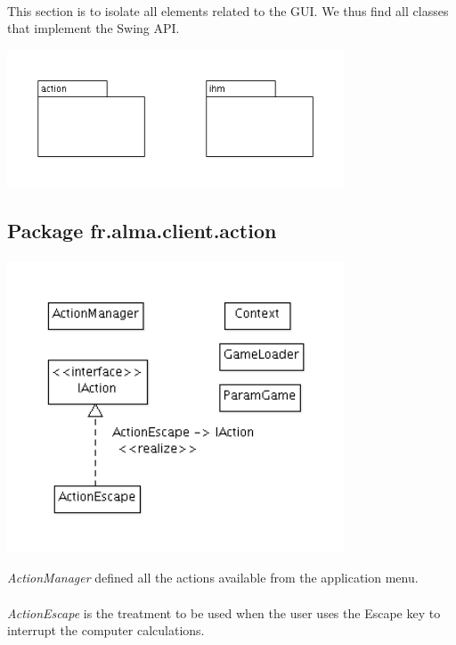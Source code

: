 \documentclass[a4paper,12pt]{report}
\begin{document}
	\paragraph*{}
	    This section is to isolate all elements related to the GUI. We thus find all classes that implement the Swing API.
	     \begin{center}
	      \includegraphics[width=0.75\textwidth]{img_rapport/designing_6.png}
	    \end{center}
	  
	\subsection{Package fr.alma.client.action}
	    \paragraph*{}
		\begin{center}
		    \includegraphics[width=0.75\textwidth]{img_rapport/designing_7.png}
		\end{center}

		\textit{ActionManager} defined all the actions available from the application menu.
	    
	    \paragraph*{}
		\textit{ActionEscape} is the treatment to be used when the user uses the Escape key to interrupt the computer calculations.
	       
\end{document}
